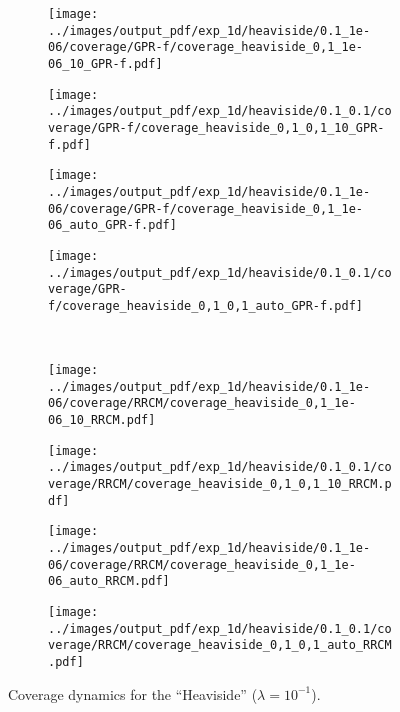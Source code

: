 \documentclass[conference]{IEEEtran}
\begin{document}
\begin{figure}%
  \centering
  \begin{subfigure}[b]{0.25\linewidth}
    \texttt{[image: ../images/output\_pdf/exp\_1d/heaviside/0.1\_1e-06/coverage/GPR-f/coverage\_heaviside\_0,1\_1e-06\_10\_GPR-f.pdf]}
  \end{subfigure}%
  \begin{subfigure}[b]{0.25\linewidth}
    \texttt{[image: ../images/output\_pdf/exp\_1d/heaviside/0.1\_0.1/coverage/GPR-f/coverage\_heaviside\_0,1\_0,1\_10\_GPR-f.pdf]}
  \end{subfigure}%
  \begin{subfigure}[b]{0.25\linewidth}
    \texttt{[image: ../images/output\_pdf/exp\_1d/heaviside/0.1\_1e-06/coverage/GPR-f/coverage\_heaviside\_0,1\_1e-06\_auto\_GPR-f.pdf]}
  \end{subfigure}%
  \begin{subfigure}[b]{0.25\linewidth}
    \texttt{[image: ../images/output\_pdf/exp\_1d/heaviside/0.1\_0.1/coverage/GPR-f/coverage\_heaviside\_0,1\_0,1\_auto\_GPR-f.pdf]}
  \end{subfigure}\\
  \begin{subfigure}[b]{0.25\linewidth}
    \texttt{[image: ../images/output\_pdf/exp\_1d/heaviside/0.1\_1e-06/coverage/RRCM/coverage\_heaviside\_0,1\_1e-06\_10\_RRCM.pdf]}
  \end{subfigure}%
  \begin{subfigure}[b]{0.25\linewidth}
    \texttt{[image: ../images/output\_pdf/exp\_1d/heaviside/0.1\_0.1/coverage/RRCM/coverage\_heaviside\_0,1\_0,1\_10\_RRCM.pdf]}
  \end{subfigure}%
  \begin{subfigure}[b]{0.25\linewidth}
    \texttt{[image: ../images/output\_pdf/exp\_1d/heaviside/0.1\_1e-06/coverage/RRCM/coverage\_heaviside\_0,1\_1e-06\_auto\_RRCM.pdf]}
  \end{subfigure}%
  \begin{subfigure}[b]{0.25\linewidth}
    \texttt{[image: ../images/output\_pdf/exp\_1d/heaviside/0.1\_0.1/coverage/RRCM/coverage\_heaviside\_0,1\_0,1\_auto\_RRCM.pdf]}
  \end{subfigure}
  \caption{Coverage dynamics for the ``Heaviside'' ($\lambda=10^{-1}$).}
  \label{fig:heaviside_1d_high_noise}
\end{figure}
\end{document}
